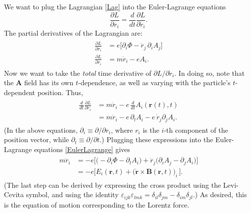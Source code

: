 \documentclass[pra,12pt]{revtex4}
\begin{document}
We want to plug the Lagrangian \eqref{Lag} into the Euler-Lagrange
equations
\begin{equation}
  \frac{\partial L}{\partial r_i} = \frac{d}{dt}
  \frac{\partial L}{\partial \dot{r}_i}.
  \label{EulerLagrange}
\end{equation}
The partial derivatives of the Lagrangian are:
\begin{align}
  \begin{aligned}
    \frac{\partial L}{\partial r_i} &=
    e\Big[\partial_i \Phi - \dot{r}_j \,\partial_i A_j \Big]\\
    \frac{\partial L}{\partial \dot{r}_i} &= m\dot{r}_i - e A_i.
  \end{aligned}
\end{align}
Now we want to take the \textit{total} time derivative of $\partial L
/\partial \dot{r}_i$.  In doing so, note that the $\mathbf{A}$ field
has its own $t$-dependence, as well as varying with the particle's
$t$-dependent position.  Thus,
\begin{align}
  \begin{aligned}
    \frac{d}{dt} \frac{\partial L}{\partial \dot{r}_i}
    &= m\ddot{r}_i - e\, \frac{d}{dt} A_i(\mathbf{r}(t),t) \\
    &= m\ddot{r}_i - e\, \partial_t A_i
    - e\, \dot{r}_j \partial_j A_i.
  \end{aligned}
\end{align}
(In the above equations, $\partial_i \equiv \partial/\partial r_i$,
where $r_i$ is the $i$-th component of the position vector, while
$\partial_t \equiv \partial/\partial t$.)  Plugging these expressions
into the Euler-Lagrange equations \eqref{EulerLagrange} gives
\begin{align}
  \begin{aligned}
    m\ddot{r}_i &=
    -e\Big[\Big(-\partial_i \Phi - \partial_t A_i\Big)
      + \dot{r}_j \Big( \partial_i A_j - \partial_j A_i\Big) \Big] \\
    &= -e \Big[E_i(\mathbf{r},t) + \big(\dot{\mathbf{r}} \times
      \mathbf{B}(\mathbf{r},t) \big)_i\, \Big].
  \end{aligned}
\end{align}
(The last step can be derived by expressing the cross product using
the Levi-Cevita symbol, and using the identity $\varepsilon_{ijk}
\varepsilon_{lmk} = \delta_{il} \delta_{jm} - \delta_{im}
\delta_{jl}$.)  As desired, this is the equation of motion
corresponding to the Lorentz force.
\end{document}
